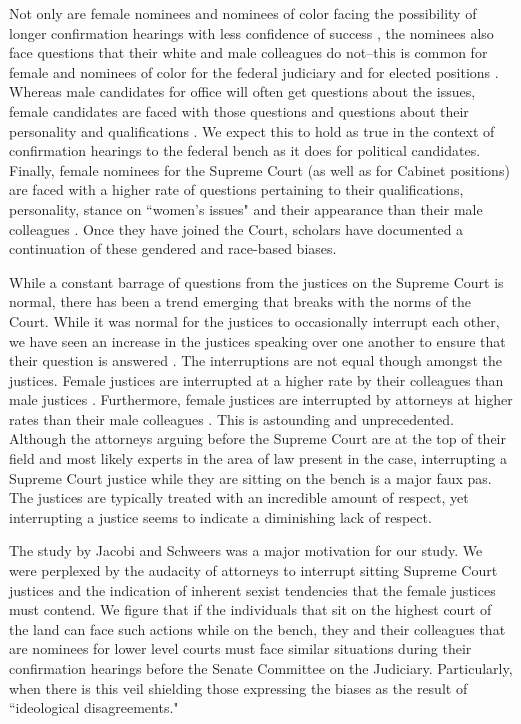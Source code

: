 \documentclass [12pt]{article}
\begin{document}
Not only are female nominees and nominees of color facing the possibility of longer confirmation hearings with less confidence of success \citep{asmussen_2011}, the nominees also face questions that their white and male colleagues do not--this is common for female and nominees of color for the federal judiciary and for elected positions \citep{boyd_2018, hayes_2015, devitt_2002, palmer_2010, schultz_1997}. Whereas male candidates for office will often get questions about the issues, female candidates are faced with those questions and questions about their personality and qualifications \citep{devitt_2002}. We expect this to hold as true in the context of confirmation hearings to the federal bench as it does for political candidates. Finally, female nominees for the Supreme Court (as well as for Cabinet positions) are faced with a higher rate of questions pertaining to their qualifications, personality, stance on ``women's issues" and their appearance than their male colleagues \citep{boyd_2018, hayes_2015, devitt_2002, palmer_2010, schultz_1997}. Once they have joined the Court, scholars have documented a continuation of these gendered and race-based biases.

While a constant barrage of questions from the justices on the Supreme Court is normal, there has been a trend emerging that breaks with the norms of the Court. While it was normal for the justices to occasionally interrupt each other, we have seen an increase in the justices speaking over one another to ensure that their question is answered \citep{jacobi_2017}. The interruptions are not equal though amongst the justices. Female justices are interrupted at a higher rate by their colleagues than male justices \citep{jacobi_2017}. Furthermore, female justices are interrupted by attorneys at higher rates than their male colleagues \citep{jacobi_2017}. This is astounding and unprecedented. Although the attorneys arguing before the Supreme Court are at the top of their field and most likely experts in the area of law present in the case, interrupting a Supreme Court justice while they are sitting on the bench is a major faux pas. The justices are typically treated with an incredible amount of respect, yet interrupting a justice seems to indicate a diminishing lack of respect. 

The study by Jacobi and Schweers \citeyearpar{jacobi_2017} was a major motivation for our study. We were perplexed by the audacity of attorneys to interrupt sitting Supreme Court justices and the indication of inherent sexist tendencies that the female justices must contend. We figure that if the individuals that sit on the highest court of the land can face such actions while on the bench, they and their colleagues that are nominees for lower level courts must face similar situations during their confirmation hearings before the Senate Committee on the Judiciary. Particularly, when there is this veil shielding those expressing the biases as the result of ``ideological disagreements."
\end{document}
